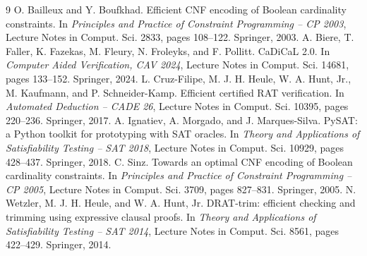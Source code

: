 \documentclass[11pt]{article}
\begin{document}
\begin{thebibliography}{9}
 O. Bailleux and Y. Boufkhad. Efficient CNF encoding of Boolean
cardinality constraints. In \emph{Principles and Practice of Constraint Programming -- CP
2003}, Lecture Notes in Comput. Sci. 2833, pages 108--122. Springer, 2003.
 A. Biere, T. Faller, K. Fazekas, M. Fleury, N. Froleyks, and F. Pollitt.
CaDiCaL 2.0. In \emph{Computer Aided Verification, CAV 2024}, Lecture Notes in Comput. Sci.
14681, pages 133--152. Springer, 2024.
 L. Cruz-Filipe, M. J. H. Heule, W. A. Hunt, Jr., M. Kaufmann, and P.
Schneider-Kamp. Efficient certified RAT verification. In \emph{Automated Deduction -- CADE
26}, Lecture Notes in Comput. Sci. 10395, pages 220--236. Springer, 2017.
 A. Ignatiev, A. Morgado, and J. Marques-Silva. PySAT: a Python toolkit for
prototyping with SAT oracles. In \emph{Theory and Applications of Satisfiability Testing --
SAT 2018}, Lecture Notes in Comput. Sci. 10929, pages 428--437. Springer, 2018.
 C. Sinz. Towards an optimal CNF encoding of Boolean cardinality
constraints. In \emph{Principles and Practice of Constraint Programming -- CP 2005},
Lecture Notes in Comput. Sci. 3709, pages 827--831. Springer, 2005.
 N. Wetzler, M. J. H. Heule, and W. A. Hunt, Jr. DRAT-trim: efficient
checking and trimming using expressive clausal proofs. In \emph{Theory and Applications of
Satisfiability Testing -- SAT 2014}, Lecture Notes in Comput. Sci. 8561, pages 422--429.
Springer, 2014.
\end{thebibliography}
\end{document}
